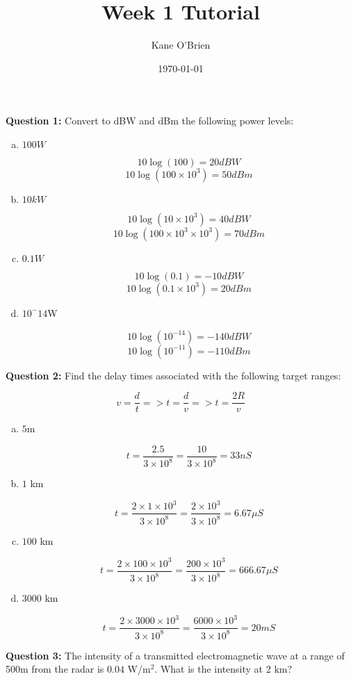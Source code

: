 \documentclass[a4paper,12pt]{article} %
\title{Week 1 Tutorial}
\author{Kane O'Brien}
\date{\today}
\begin{document}
\maketitle

\textbf{Question 1:} Convert to dBW and dBm the following power levels:
\begin{enumerate}[(a)]
    \item $100W$
    
        $$10 \log(100) = 20 dBW $$
        $$10 \log(100 \times 10^3) = 50 dBm$$ 
    \item $10kW$
    
        $$10 \log(10 \times 10^3) = 40 dBW$$
        $$10 \log(100 \times 10^3\times 10^3) = 70 dBm$$
    \item $0.1W$
    
        $$10 \log(0.1) = -10 dBW$$
        $$10 \log(0.1 \times 10^3) = 20 dBm$$

    \item $10^-14$W
    
        $$10 \log(10^{-14}) = -140 dBW$$
        $$10 \log(10^{-11}) = -110 dBm$$

\end{enumerate}

\textbf{Question 2:} Find the delay times associated with the following target ranges:

\vspace{1ex}
$$ v =\frac{d}{t} => t=\frac{d}{v} => t=\frac{2R}{v}$$
\begin{enumerate}[(a)]
    \item $5$m
    
    $$t=\frac{2.5}{3\times10^8} = \frac{10}{3\times10^8} = 33 nS$$
    \item $1$ km
    
    $$t=\frac{2\times1\times10^3}{3\times10^8} = \frac{2\times10^3}{3\times10^8} = 6.67 \mu S$$
    \item $100$ km
    
    $$t=\frac{2\times100\times10^3}{3\times10^8} = \frac{200\times10^3}{3\times10^8} = 666.67 \mu S$$
    \item $3000$ km
    
   $$t=\frac{2\times3000\times10^3}{3\times10^8} = \frac{6000\times10^3}{3\times10^8} = 20mS$$
\end{enumerate}

\vspace{1ex}
\textbf{Question 3:} The intensity of a transmitted electromagnetic wave at a range of 500m from the radar is $0.04$ W/m$^2$. What is the intensity at 2 km?
\end{document}
